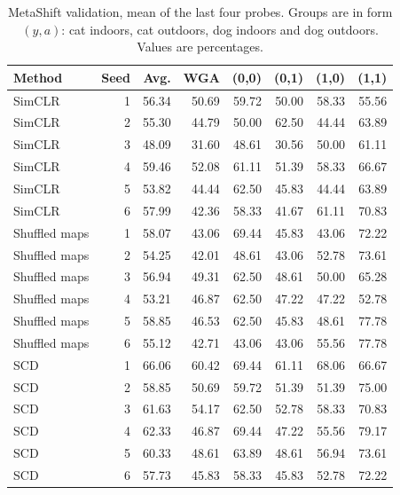 \documentclass{article}
\begin{document}
\begin{table}[htbp]
\centering\small
\setlength{\tabcolsep}{4pt}
\caption{MetaShift validation, mean of the last four probes. Groups are in form $(y,a)$: cat indoors, cat outdoors, dog indoors and dog outdoors. Values are percentages.}
\begin{tabular}{lrrrrrrr}
\toprule
Method & Seed & Avg. & WGA & (0,0) & (0,1) & (1,0) & (1,1) \\
\midrule
SimCLR & 1 & 56.34 & 50.69 & 59.72 & 50.00 & 58.33 & 55.56 \\
SimCLR & 2 & 55.30 & 44.79 & 50.00 & 62.50 & 44.44 & 63.89 \\
SimCLR & 3 & 48.09 & 31.60 & 48.61 & 30.56 & 50.00 & 61.11 \\
SimCLR & 4 & 59.46 & 52.08 & 61.11 & 51.39 & 58.33 & 66.67 \\
SimCLR & 5 & 53.82 & 44.44 & 62.50 & 45.83 & 44.44 & 63.89 \\
SimCLR & 6 & 57.99 & 42.36 & 58.33 & 41.67 & 61.11 & 70.83 \\
\addlinespace
Shuffled maps & 1 & 58.07 & 43.06 & 69.44 & 45.83 & 43.06 & 72.22 \\
Shuffled maps & 2 & 54.25 & 42.01 & 48.61 & 43.06 & 52.78 & 73.61 \\
Shuffled maps & 3 & 56.94 & 49.31 & 62.50 & 48.61 & 50.00 & 65.28 \\
Shuffled maps & 4 & 53.21 & 46.87 & 62.50 & 47.22 & 47.22 & 52.78 \\
Shuffled maps & 5 & 58.85 & 46.53 & 62.50 & 45.83 & 48.61 & 77.78 \\
Shuffled maps & 6 & 55.12 & 42.71 & 43.06 & 43.06 & 55.56 & 77.78 \\
\addlinespace
SCD & 1 & 66.06 & 60.42 & 69.44 & 61.11 & 68.06 & 66.67 \\
SCD & 2 & 58.85 & 50.69 & 59.72 & 51.39 & 51.39 & 75.00 \\
SCD & 3 & 61.63 & 54.17 & 62.50 & 52.78 & 58.33 & 70.83 \\
SCD & 4 & 62.33 & 46.87 & 69.44 & 47.22 & 55.56 & 79.17 \\
SCD & 5 & 60.33 & 48.61 & 63.89 & 48.61 & 56.94 & 73.61 \\
SCD & 6 & 57.73 & 45.83 & 58.33 & 45.83 & 52.78 & 72.22 \\
\bottomrule
\end{tabular}
\end{table}
\end{document}
